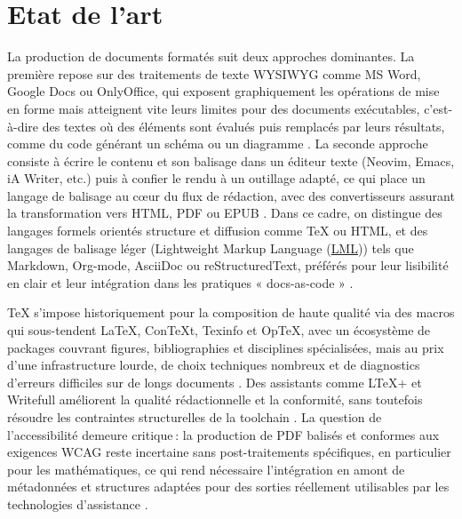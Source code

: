 \documentclass[a4paper,12pt]{article}
\def\footnote#1{}%
\begin{document}
\section{Etat de l'art}
\label{sec:orgd419d34}
La production de documents formatés suit deux approches dominantes. La première repose sur des traitements de texte WYSIWYG comme MS Word, Google Docs ou OnlyOffice, qui exposent graphiquement les opérations de mise en forme mais atteignent vite leurs limites pour des documents exécutables, c’est-à-dire des textes où des éléments sont évalués puis remplacés par leurs résultats, comme du code générant un schéma ou un diagramme \footnote{\textbf{Document exécutable :} Désigne un document dont des éléments sont exécutés (p. ex. code) et remplacés par le produit de l'exécution (p. ex. schéma ou diagrammes).} \autocite{holmesReproducibleManuscriptPreparation2021,haghishMarkdocLiterateProgramming2016,lorenaa.barbaHardRoadReproducibility2016}. La seconde approche consiste à écrire le contenu et son balisage dans un éditeur texte (Neovim, Emacs, iA Writer, etc.) puis à confier le rendu à un outillage adapté, ce qui place un langage de balisage au cœur du flux de rédaction, avec des convertisseurs assurant la transformation vers HTML, PDF ou EPUB \autocite{johnmacfarlanePandocUsersGuide2025,massimilianodominiciOverviewPandoc2014}. Dans ce cadre, on distingue des langages formels orientés structure et diffusion comme \TeX{} ou HTML, et des langages de balisage léger (Lightweight Markup Language
 (\protect\hyperlink{gls-2}{\label{gls-2-use-1}LML})) tels que Markdown, Org-mode, AsciiDoc ou reStructuredText, préférés pour leur lisibilité en clair et leur intégration dans les pratiques « docs-as-code » \autocite{johnmacfarlaneCommonMarkSpec2024,khareUsingOrgmodeSubversion2012,allenAsciiDocWritersGuide,goodgerReStructuredTextMarkupSpecification2025}.

\TeX{} s’impose historiquement pour la composition de haute qualité via des macros qui sous-tendent \LaTeX{}, ConTeXt, Texinfo et OpTeX, avec un écosystème de packages couvrant figures, bibliographies et disciplines spécialisées, mais au prix d’une infrastructure lourde, de choix techniques nombreux et de diagnostics d’erreurs difficiles sur de longs documents \autocite{petrolsakTeXNutshell2021,petrolsakOpTeXNewGeneration2020,olsakComparisonOpTeXOther2021}. Des assistants comme LTeX+ et Writefull améliorent la qualité rédactionnelle et la conformité, sans toutefois résoudre les contraintes structurelles de la toolchain \autocite{LtexplusLtexlsplus2025,Writefull}. La question de l’accessibilité demeure critique : la production de PDF balisés et conformes aux exigences WCAG reste incertaine sans post-traitements spécifiques, en particulier pour les mathématiques, ce qui rend nécessaire l’intégration en amont de métadonnées et structures adaptées pour des sorties réellement utilisables par les technologies d’assistance \autocite{LaTeXAccessibilityGuide2024,jasonc.whiteUsingMarkupLanguages2022,seoLaTeXNOTEasy2019,voeglerMarkdownSimpleSyntax2014}.
\end{document}

